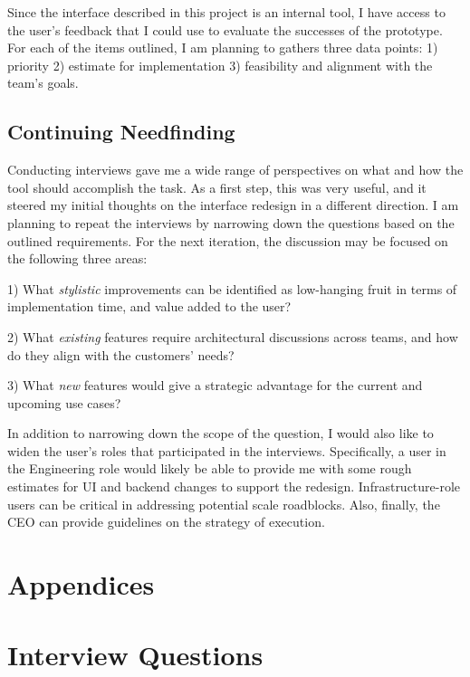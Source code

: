 \documentclass[12pt,letterpaper]{article}
\begin{document}
Since the interface described in this project is an internal tool, I have access to the user's feedback that I could use to evaluate the successes of the prototype. For each of the items outlined, I am planning to gathers three data points: 1) priority 2) estimate for implementation 3) feasibility and alignment with the team's goals.  


\subsection*{Continuing Needfinding}
Conducting interviews gave me a wide range of perspectives on what and how the tool should accomplish the task. As a first step, this was very useful, and it steered my initial thoughts on the interface redesign in a different direction. I am planning to repeat the interviews by narrowing down the questions based on the outlined requirements. For the next iteration, the discussion may be focused on the following three areas:

1) What \textit{stylistic} improvements can be identified as low-hanging fruit in terms of implementation time, and value added to the user?

2) What \textit{existing} features require architectural discussions across teams, and how do they align with the customers' needs?

3) What \textit{new} features would give a strategic advantage for the current and upcoming use cases? 

In addition to narrowing down the scope of the question, I would also like to widen the user's roles that participated in the interviews. Specifically, a user in the Engineering role would likely be able to provide me with some rough estimates for UI and backend changes to support the redesign. Infrastructure-role users can be critical in addressing potential scale roadblocks. Also, finally, the CEO can provide guidelines on the strategy of execution. 

 


\section*{Appendices}

\appendix

\section{Interview Questions}
\end{document}
